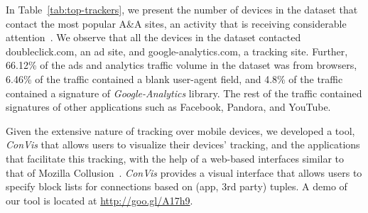 In Table~\ref{tab:top-trackers}, we present the number of devices in the \mobWild dataset that contact the most popular A\&A sites, an activity that is receiving considerable attention~\cite{roesner:webtrackers,leontiadis:mobileads,vallina-rod:ads}.
We observe that all the devices in the \mobWild dataset contacted doubleclick.com, an ad site, and google-analytics.com, a tracking site. 
Further, 66.12\% of the ads and analytics traffic volume in the \mobWild dataset was from browsers, 6.46\% of the
traffic contained a blank user-agent field, and 4.8\% of the traffic contained a signature of \emph{Google-Analytics} library.
The rest of the traffic contained signatures of other applications such as Facebook, Pandora, and YouTube.

Given the extensive nature of tracking over mobile devices, we developed a tool, \emph{ConVis} that allows users to visualize their devices' tracking, and the applications that facilitate this tracking, with the help of a web-based interfaces similar to that of Mozilla Collusion~\cite{collusion}. \emph{ConVis} provides a visual interface that allows 
 users to specify block lists for connections based on (app, 3rd party) tuples. A demo of our tool is 
 located at \url{http://goo.gl/A17h9}. 







